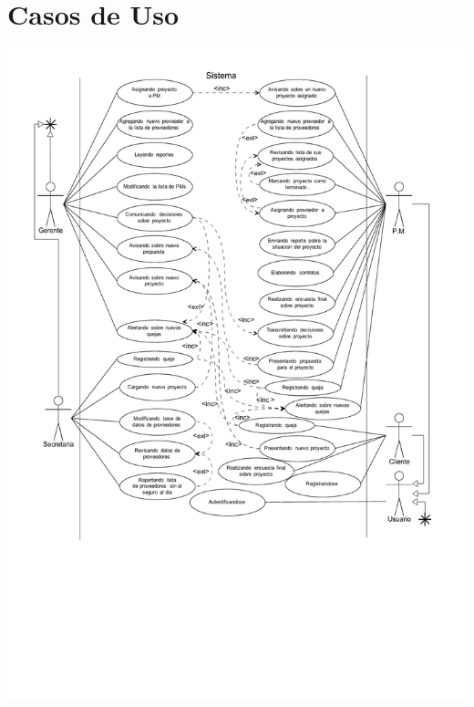 \documentclass{article}
\theoremstyle{definition}
\theoremstyle{remark}
\begin{document}
\newenvironment{casodeuso}
{\begin{table}[H]}{%
\begin{tabular}{|p{0.5\linewidth} p{0.5\linewidth}|}\hline
\multicolumn{2}{|l|}{\textbf{Caso de Uso: \ref{cu:\givenculabel}) \givencutitle}} \\
\multicolumn{2}{|l|}{\textbf{Actor:} \givencuactors} \\
\multicolumn{2}{|l|}{\textbf{Pre:} \givencupre} \\
\multicolumn{2}{|l|}{\textbf{Post:} \givencupost} \\
\vspace{1px}\textbf{Curso Normal} & \vspace{1px}\textbf{Curso Alternativo} \\
\givencucourse
\hline
\end{tabular}
\caption{\givencutitle}
\label{cu:\givenculabel}
\end{table}}

\section{Casos de Uso}

\includegraphics[width=\textwidth,height=\textheight,keepaspectratio,trim={0 1 cm 0 0},clip]{images/agentes.pdf}
\end{document}
